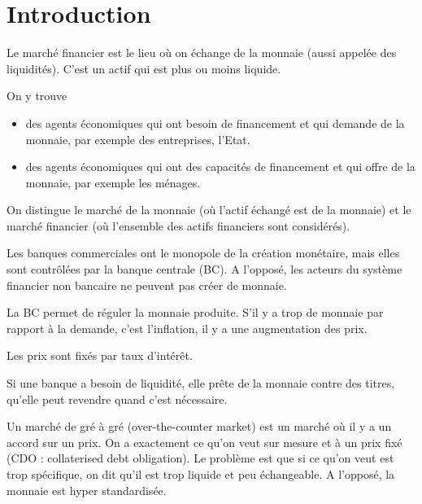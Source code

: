 \part{Introduction}

Le marché financier est le lieu où on échange de la monnaie (aussi appelée des liquidités). C'est un actif qui est plus ou moins liquide.

On y trouve

\begin{itemize}
	\item des agents économiques qui ont besoin de financement et qui demande de la monnaie, par exemple des entreprises, l'Etat.
	\item des agents économiques qui ont des capacités de financement et qui offre de la monnaie, par exemple les ménages.
\end{itemize}

On distingue le marché de la monnaie (où l'actif échangé est de la monnaie) et le marché financier (où l'ensemble des actifs financiers sont considérés).


Les banques commerciales ont le monopole de la création monétaire, mais elles sont contrôlées par la banque centrale (BC). A l'opposé, les acteurs du système financier non bancaire ne peuvent pas créer de monnaie.

La BC permet de réguler la monnaie produite. S'il y a trop de monnaie par rapport à la demande, c'est l'inflation, il y a une augmentation des prix.

Les prix sont fixés par taux d'intérêt.

Si une banque a besoin de liquidité, elle prête de la monnaie contre des titres, qu'elle peut revendre quand c'est nécessaire.

Un marché de gré à gré (over-the-counter market) est un marché où il y a un accord sur un prix. On a exactement ce qu'on veut sur mesure et à un prix fixé (CDO : collaterised debt obligation). Le problème est que si ce qu'on veut est trop spécifique, on dit qu'il est trop liquide et peu échangeable. A l'opposé, la monnaie est hyper standardisée.